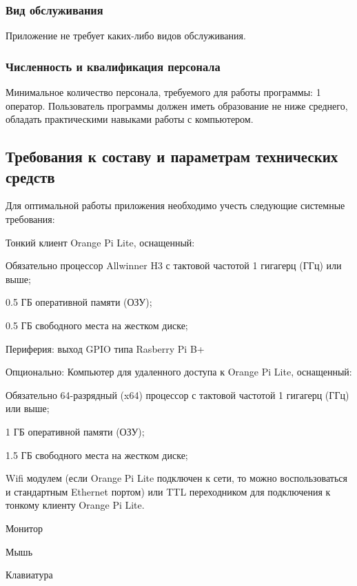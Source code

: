 \subsubsection{Вид обслуживания}
Приложение не требует каких-либо видов обслуживания.
\subsubsection{Численность и квалификация персонала}
Минимальное количество персонала, требуемого для работы программы: 1 оператор. Пользователь программы должен иметь образование не ниже среднего, обладать практическими навыками работы с компьютером.


\subsection{Требования к составу и параметрам технических средств}
Для оптимальной работы приложения необходимо учесть следующие системные требования:
\begin{my_enumerate}

\item Тонкий клиент Orange Pi Lite, оснащенный:
    \begin{my_enumerate}
    \item Обязательно процессор Allwinner H3 с тактовой частотой 1 гигагерц (ГГц) или выше;
    \item 0.5 ГБ оперативной памяти (ОЗУ);
    \item 0.5 ГБ свободного места на жестком диске;
    \item Периферия: выход GPIO типа Rasberry Pi B+
    \end{my_enumerate}
\item Опционально: Компьютер для удаленного доступа к Orange Pi Lite, оснащенный:
    \begin{my_enumerate}
    \item Обязательно 64-разрядный (x64) процессор с тактовой частотой 1 гигагерц (ГГц) или выше;
    \item 1 ГБ оперативной памяти (ОЗУ);
    \item 1.5 ГБ свободного места на жестком диске;
    \item Wifi модулем (если Orange Pi Lite подключен к сети, то можно воспользоваться и стандартным Ethernet портом) или TTL переходником для подключения к тонкому клиенту Orange Pi Lite.
    \end{my_enumerate}
\item Монитор
\item Мышь
\item Клавиатура
\end{my_enumerate}


